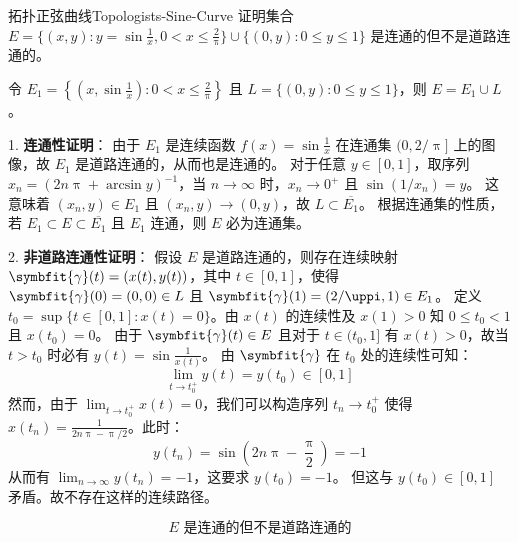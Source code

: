 \begin{problem}{拓扑正弦曲线}{Topologists-Sine-Curve}
    证明集合 $E = \{(x,y) : y = \sin \frac{1}{x}, 0 < x \leqslant \frac{2}{\uppi}\} \cup \{(0,y) : 0 \leqslant y \leqslant 1\}$ 是连通的但不是道路连通的。

    \begin{center}
    \end{center}
\end{problem}

\begin{myproof}
    令 $E_1 = \left\{ \left(x, \sin \frac{1}{x}\right) : 0 < x \leqslant \frac{2}{\uppi} \right\}$ 且 $L = \{(0, y) : 0 \leqslant y \leqslant 1\}$，则 $E = E_1 \cup L$。

    1. \textbf{连通性证明}：
    由于 $E_1$ 是连续函数 $f(x) = \sin \frac{1}{x}$ 在连通集 $(0, 2/\uppi]$ 上的图像，故 $E_1$ 是道路连通的，从而也是连通的。
    对于任意 $y \in [0, 1]$，取序列 $x_n = \left( 2n\uppi + \arcsin y \right)^{-1}$，当 $n \to \infty$ 时，$x_n \to 0^+$ 且 $\sin(1/x_n) = y$。
    这意味着 $(x_n, y) \in E_1$ 且 $(x_n, y) \to (0, y)$，故 $L \subset \overline{E_1}$。
    根据连通集的性质，若 $E_1 \subset E \subset \overline{E_1}$ 且 $E_1$ 连通，则 $E$ 必为连通集。

    2. \textbf{非道路连通性证明}：
    假设 $E$ 是道路连通的，则存在连续映射 $\symbfit{\gamma}(t) = (x(t), y(t))$，其中 $t \in [0, 1]$，使得 $\symbfit{\gamma}(0) = (0, 0) \in L$ 且 $\symbfit{\gamma}(1) = (2/\uppi, 1) \in E_1$。
    定义 $t_0 = \sup \{ t \in [0, 1] : x(t) = 0 \}$。由 $x(t)$ 的连续性及 $x(1) > 0$ 知 $0 \leqslant t_0 < 1$ 且 $x(t_0) = 0$。
    由于 $\symbfit{\gamma}(t) \in E$ 且对于 $t \in (t_0, 1]$ 有 $x(t) > 0$，故当 $t > t_0$ 时必有 $y(t) = \sin \frac{1}{x(t)}$。
    由 $\symbfit{\gamma}$ 在 $t_0$ 处的连续性可知：
    \begin{equation*}
        \lim_{t \to t_0^+} y(t) = y(t_0) \in [0, 1]
    \end{equation*}
    然而，由于 $\lim_{t \to t_0^+} x(t) = 0$，我们可以构造序列 $t_n \to t_0^+$ 使得 $x(t_n) = \frac{1}{2n\uppi - \uppi/2}$。此时：
    \begin{equation*}
        y(t_n) = \sin\left( 2n\uppi - \frac{\uppi}{2} \right) = -1
    \end{equation*}
    从而有 $\lim_{n \to \infty} y(t_n) = -1$，这要求 $y(t_0) = -1$。
    但这与 $y(t_0) \in [0, 1]$ 矛盾。故不存在这样的连续路径。

    \begin{equation*}
        \boxed{E \text{ 是连通的但不是道路连通的}}
    \end{equation*}
\end{myproof}


